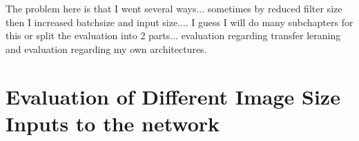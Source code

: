 \begin{table}[h] \centering
{}
\caption{Resnet18 with different number of filters on the FINAL dataset. The number of filters present in paranthesis is the number of filters used per layer.}
\label{tbl:resnet18-sixteen}
\end{table}

The problem here is that I went several ways... sometimes by reduced filter size then I increased batchsize and input size.... I guess I will do many subchapters for this or split the evaluation into 2 parts... evaluation regarding transfer leraning and evaluation regarding my own architectures.

\section{Evaluation of Different Image Size Inputs to the network}

\begin{table}[h] \centering
{}
\caption{Resnet18 FiveCrop Implementation with and without pre-training. FINAL (regular) means ResNet18 with the resizing of the image instead of cropping and averaging}
\label{tbl:resnet18-448}
\end{table}

